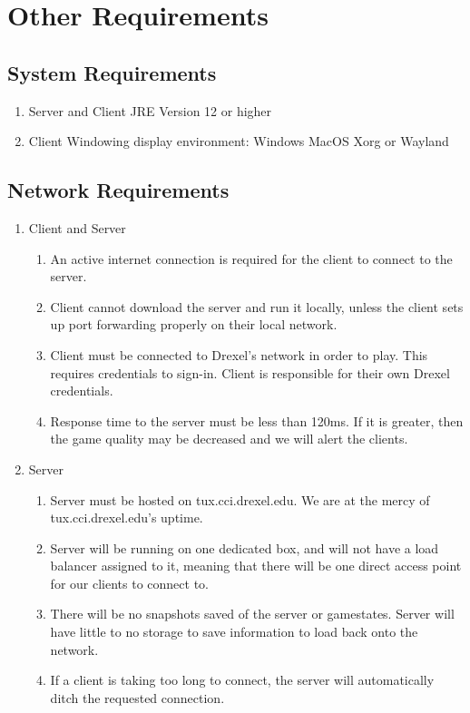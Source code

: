 \documentclass{scrreprt}
\begin{document}
\chapter{Other Requirements}

\section{System Requirements}

\begin{enumerate}[label*=S\arabic*.]
    \item Server and Client
        \subitem JRE Version 12 or higher
    \item Client
        \subitem Windowing display environment:
            \subsubitem Windows
            \subsubitem MacOS
            \subsubitem Xorg or Wayland
\end{enumerate}

\section{Network Requirements}

\begin{enumerate}[label*=N\arabic*.]
    \item Client and Server
	 \begin{enumerate}[label*=\arabic*.]
        \item An active internet connection is required for the client to connect to the server.
        \item Client cannot download the server and run it locally, unless the client sets up port forwarding properly on their local network.
        \item Client must be connected to Drexel's network in order to play. This requires credentials to sign-in. Client is responsible for their own Drexel credentials. 
        \item Response time to the server must be less than 120ms. If it is greater, then the game quality may be decreased and we will alert the clients.
	  \end{enumerate}
    \item Server
 	\begin{enumerate}[label*=\arabic*.]
        \item Server must be hosted on tux.cci.drexel.edu. We are at the mercy of tux.cci.drexel.edu's uptime.
        \item Server will be running on one dedicated box, and will not have a load balancer assigned to it, meaning that there will be one direct access point for our clients to connect to.
        \item There will be no snapshots saved of the server or gamestates. Server will have little to no storage to save information to load back onto the network.
        \item If a client is taking too long to connect, the server will automatically ditch the requested connection.
  \end{enumerate}
\end{enumerate}
\end{document}
